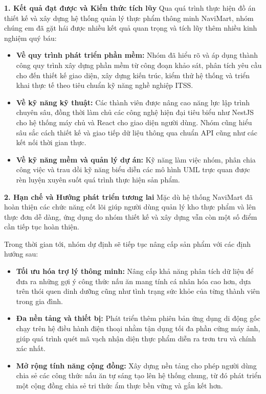 \documentclass[../main.tex]{subfiles}
\begin{document}
 \textbf{1. Kết quả đạt được và Kiến thức tích lũy}
Qua quá trình thực hiện đồ án thiết kế và xây dựng hệ thống quản lý thực phẩm thông minh NaviMart, nhóm chúng em đã gặt hái được nhiều kết quả quan trọng và tích lũy thêm nhiều kinh nghiệm quý báu:

\begin{itemize}
    \item \textbf{Về quy trình phát triển phần mềm:} Nhóm đã hiểu rõ và áp dụng thành công quy trình xây dựng phần mềm từ công đoạn khảo sát, phân tích yêu cầu cho đến thiết kế giao diện, xây dựng kiến trúc, kiểm thử hệ thống và triển khai thực tế theo tiêu chuẩn kỹ năng nghề nghiệp ITSS.
    \item \textbf{Về kỹ năng kỹ thuật:} Các thành viên được nâng cao năng lực lập trình chuyên sâu, đồng thời làm chủ các công nghệ hiện đại tiêu biểu như NestJS cho hệ thống máy chủ và React cho giao diện người dùng. Nhóm cũng hiểu sâu sắc cách thiết kế và giao tiếp dữ liệu thông qua chuẩn API cũng như các kết nối thời gian thực.
    \item \textbf{Về kỹ năng mềm và quản lý dự án:} Kỹ năng làm việc nhóm, phân chia công việc và trau dồi kỹ năng biểu diễn các mô hình UML trực quan được rèn luyện xuyên suốt quá trình thực hiện sản phẩm.
\end{itemize}

\textbf{2. Hạn chế và Hướng phát triển tương lai}
Mặc dù hệ thống NaviMart đã hoàn thiện các chức năng cốt lõi giúp người dùng quản lý kho thực phẩm và lên thực đơn dễ dàng, ứng dụng do nhóm thiết kế và xây dựng vẫn còn một số điểm cần tiếp tục hoàn thiện. 

Trong thời gian tới, nhóm dự định sẽ tiếp tục nâng cấp sản phẩm với các định hướng sau:
\begin{itemize}
    \item \textbf{Tối ưu hóa trợ lý thông minh:} Nâng cấp khả năng phân tích dữ liệu để đưa ra những gợi ý công thức nấu ăn mang tính cá nhân hóa cao hơn, dựa trên thói quen dinh dưỡng cũng như tình trạng sức khỏe của từng thành viên trong gia đình.
    \item \textbf{Đa nền tảng và thiết bị:} Phát triển thêm phiên bản ứng dụng di động gốc chạy trên hệ điều hành điện thoại nhằm tận dụng tối đa phần cứng máy ảnh, giúp quá trình quét mã vạch nhận diện thực phẩm diễn ra trơn tru và chính xác nhất.
    \item \textbf{Mở rộng tính năng cộng đồng:} Xây dựng nền tảng cho phép người dùng chia sẻ các công thức nấu ăn tự sáng tạo lên hệ thống chung, từ đó phát triển một cộng đồng chia sẻ tri thức ẩm thực bền vững và gắn kết hơn.
\end{itemize}
\end{document}
